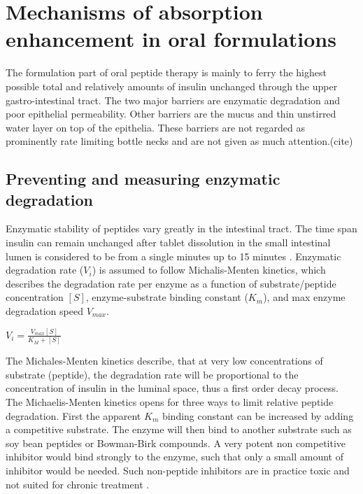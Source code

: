 \section{Mechanisms of absorption enhancement in oral formulations}
The formulation part of oral peptide therapy is mainly to ferry the highest possible total and relatively amounts of insulin unchanged through the upper gastro-intestinal tract. The two major barriers are enzymatic degradation and poor epithelial permeability. Other barriers are the mucus and thin unstirred water layer on top of the epithelia. These barriers are not regarded as prominently rate limiting bottle necks and are not given as much attention.(cite)

\subsection{Preventing and measuring enzymatic degradation}
Enzymatic stability of peptides vary greatly in the intestinal tract. The time span insulin can remain unchanged after tablet dissolution in the small intestinal lumen is considered to be from a single minutes up to 15 minutes \cite{welling2014citric}. Enzymatic degradation rate ($V_i$) is assumed to follow Michalis-Menten kinetics, which describes the degradation rate per enzyme as a function of substrate/peptide concentration $[S]$, enzyme-substrate binding constant ($K_m$), and max enzyme degradation speed $V_{max}$.

$V_i = \frac{V_{max} [S]}{K_{M}+[S]}$

The Michales-Menten kinetics describe, that at very low concentrations of substrate (peptide), the degradation rate will be proportional to the concentration of insulin in the luminal space, thus a first order decay process. 
The Michaelis-Menten kinetics opens for three ways to limit relative peptide degradation. First the apparent $K_m$ binding constant can be increased by adding a competitive substrate. The enzyme will then bind to another substrate such as soy bean peptides or Bowman-Birk compounds. A very potent non competitive inhibitor would bind strongly to the enzyme, such that only a small amount of inhibitor would be needed. Such non-peptide inhibitors are in practice toxic and not suited for chronic treatment \cite{bernkop1998use,murthy1980effect}. 

